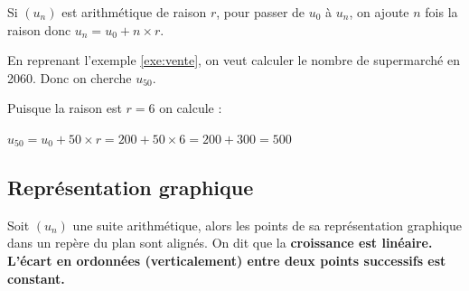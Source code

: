 \documentclass[10pt,a4paper,openany,twoside]{book}
\begin{document}
\begin{dem}{}{}
Si $(u_n)$ est arithmétique de raison $r$, pour passer de $u_0$ à $u_n$, on ajoute $n$ fois la raison donc $u_n=u_0+n \times r$.
\end{dem}


\begin{ex}{}{}
	En reprenant l'exemple \ref{exe:vente}, on veut calculer le nombre de supermarché en 2060. Donc on cherche $u_{50}$.

	Puisque la raison est $r=6$ on calcule :

	$u_{50} = u_0+50\times r = 200 + 50\times 6 = 200 + 300 = 500$
\end{ex}


\subsection{Représentation graphique}

\begin{prop}{}{}
Soit $(u_n)$ une suite arithmétique, alors les points de sa représentation graphique dans un repère du plan sont alignés. On dit que la \bf{croissance est linéaire}. L'écart en ordonnées (verticalement) entre deux points successifs est constant.
\end{prop}
\end{document}

